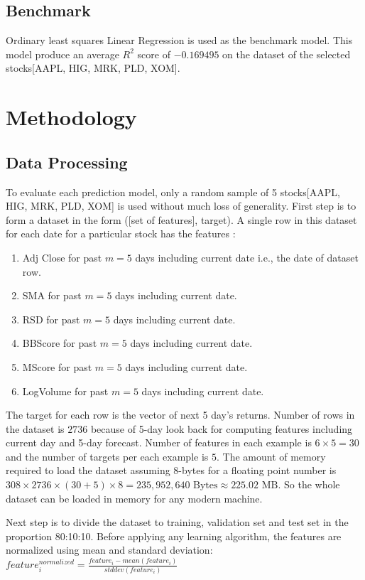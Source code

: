 \documentclass[10pt]{report}
\begin{document}
\subsection*{Benchmark}
Ordinary least squares Linear Regression is used as the benchmark model. This model produce an average $R^2$ score of $-0.169495$ on the dataset of the selected stocks[AAPL, HIG, MRK, PLD, XOM].
\section{Methodology}
\subsection*{Data Processing}
To evaluate each prediction model, only a random sample of 5 stocks[AAPL, HIG, MRK, PLD, XOM] is used without much loss of generality. First step is to form a dataset in the form ([set of features], target). A single row in this dataset for each date for a particular stock has the features :
\begin{enumerate}
\item Adj Close for past $m=5$ days including current date i.e., the date of dataset row.
\item SMA for past $m=5$ days including current date.
\item RSD for past $m=5$ days including current date.
\item BBScore for past $m=5$ days including current date.
\item MScore for past $m=5$ days including current date.
\item LogVolume for past $m=5$ days including current date.
\end{enumerate}
The target for each row is the vector of next 5 day's returns. Number of rows in the dataset is $2736$ because of 5-day look back for computing features including current day and 5-day forecast. Number of features in each example is $6 \times 5 = 30$ and the number of targets per each example is $5$. The amount of memory required to load the dataset assuming 8-bytes for a floating point number is $ 308 \times 2736 \times ( 30  +  5 ) \times 8 = 235,952,640 \text{ Bytes} \approx 225.02 \text{ MB}$. So the whole dataset can be loaded in memory for any modern machine.

Next step is to divide the dataset to training, validation set and test set in the proportion 80:10:10. Before applying any learning algorithm, the features are normalized using mean and standard deviation:
$feature_i^{normalized} = \frac{feature_i - mean(feature_i)}{stddev(feature_i)}$
\end{document}
